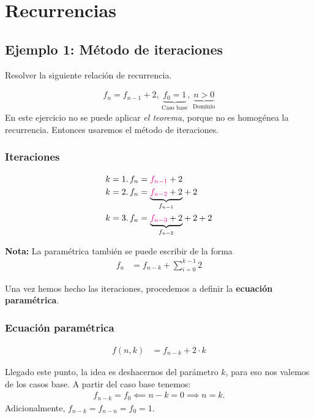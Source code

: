 \section{Recurrencias}

\subsection{Ejemplo 1: Método de iteraciones}

Resolver la siguiente relación de recurrencia.

\begin{align*}
f_n=f_{n-1}+2,\,\underset{\text{Caso base}}{\underbrace{f_0=1}},\,\underset{\text{Dominio}}{\underbrace{n>0}}
\end{align*}
En este ejercicio no se puede aplicar \textit{el teorema}, porque no es homogénea la recurrencia. Entonces usaremos el método de iteraciones.

\subsubsection{Iteraciones}
\begin{align*}
	k=1.\,f_n&={\color{magenta}f_{n-1}}+2\\
	k=2.\,f_n&=\underset{f_{n-1}}{\underbrace{{\color{magenta}f_{n-2}}+2}}+2\\
	k=3.\,f_n&=\underset{f_{n-2}}{\underbrace{{\color{magenta} f_{n-3}}+2}}+2+2
\end{align*}

\textbf{Nota:} La paramétrica también se puede escribir de la forma
\begin{align*}
f_n&=f_{n-k}+\sum_{i=0}^{k-1}{2}
\end{align*}

Una vez hemos hecho las iteraciones, procedemos a definir la \textbf{ecuación paramétrica}.

\subsubsection{Ecuación paramétrica}

\begin{align}
\label{eq:ej1-parametrica}
f(n,k)&=f_{n-k}+2\cdot k
\end{align}

Llegado este punto, la idea es deshacernos del parámetro $k$, para eso nos valemos de los casos base. A partir del caso base tenemos:
\begin{align*}
f_{n-k}=f_{0}\impliedby n-k=0\implies n=k.
\end{align*}
Adicionalmente, $f_{n-k}=f_{n-n}=f_0=1$.

